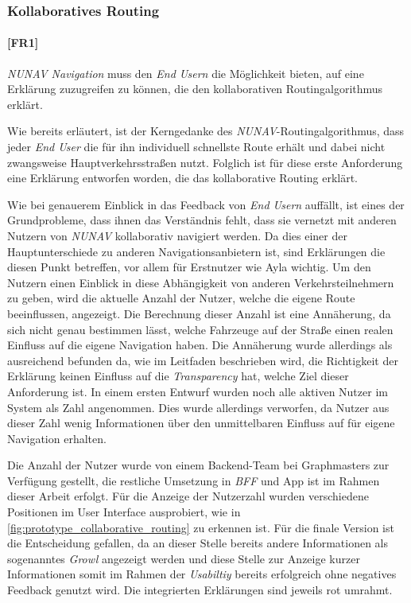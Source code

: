 \subsubsection{Kollaboratives Routing}

\paragraph{[FR1]} \textit{NUNAV Navigation} muss den \textit{End Usern} die Möglichkeit bieten, auf eine Erklärung zuzugreifen zu können, die den kollaborativen Routingalgorithmus erklärt.

\bigskip

Wie bereits erläutert, ist der Kerngedanke des \textit{NUNAV}-Routingalgorithmus, dass jeder \textit{End User} die für ihn individuell schnellste Route erhält und dabei nicht zwangsweise Hauptverkehrsstraßen nutzt. Folglich ist für diese erste Anforderung eine Erklärung entworfen worden, die das kollaborative Routing erklärt.

Wie bei genauerem Einblick in das Feedback von \textit{End Usern} auffällt, ist eines der Grundprobleme, dass ihnen das Verständnis fehlt, dass sie vernetzt mit anderen Nutzern von \textit{NUNAV} kollaborativ navigiert werden. Da dies einer der Hauptunterschiede zu anderen Navigationsanbietern ist, sind Erklärungen die diesen Punkt betreffen, vor allem für Erstnutzer wie Ayla wichtig. Um den Nutzern einen Einblick in diese Abhängigkeit von anderen Verkehrsteilnehmern zu geben, wird die aktuelle Anzahl der Nutzer, welche die eigene Route beeinflussen, angezeigt. Die Berechnung dieser Anzahl ist eine Annäherung, da sich nicht genau bestimmen lässt, welche Fahrzeuge auf der Straße einen realen Einfluss auf die eigene Navigation haben. Die Annäherung wurde allerdings als ausreichend befunden da, wie im Leitfaden beschrieben wird, die Richtigkeit der Erklärung keinen Einfluss auf die \textit{Transparency} hat, welche Ziel dieser Anforderung ist. In einem ersten Entwurf wurden noch alle aktiven Nutzer im System als Zahl angenommen. Dies wurde allerdings verworfen, da Nutzer aus dieser Zahl wenig Informationen über den unmittelbaren Einfluss auf für eigene Navigation erhalten.

Die Anzahl der Nutzer wurde von einem Backend-Team bei Graphmasters zur Verfügung gestellt, die restliche Umsetzung in \textit{BFF} und App ist im Rahmen dieser Arbeit erfolgt. Für die Anzeige der Nutzerzahl wurden verschiedene Positionen im User Interface ausprobiert, wie in \autoref{fig:prototype_collaborative_routing} zu erkennen ist. Für die finale Version ist die Entscheidung gefallen, da an dieser Stelle bereits andere Informationen als sogenanntes \textit{Growl} angezeigt werden und diese Stelle zur Anzeige kurzer Informationen somit im Rahmen der \textit{Usabiltiy} bereits erfolgreich ohne negatives Feedback genutzt wird. Die integrierten Erklärungen sind jeweils rot umrahmt.

